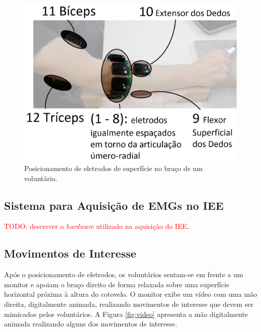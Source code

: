 \begin{figure}[htb]
	\caption{\label{fig:eletrodos}Posicionamento de eletrodos de superfície no braço de um voluntário.}
	\begin{center}
	    \includegraphics[width=0.75\linewidth]{./img/eletrodos.png}
	\end{center}
\end{figure}

			\subsection{Sistema para Aquisição de EMGs no IEE}
\textcolor{red}{TODO: descrever o \emph{hardware} utilizado na aquisição do IEE}.

			\subsection{Movimentos de Interesse}
Após o posicionamento de eletrodos, os voluntários sentam-se em frente a um monitor e apoiam o braço direito de forma relaxada sobre uma superfície horizontal próxima à altura do cotovelo. O monitor exibe um vídeo com uma mão direita, digitalmente animada, realizando movimentos de interesse que devem ser mimicados pelos voluntários. A Figura \ref{fig:video} apresenta a mão digitalmente animada realizando alguns dos movimentos de interesse.

